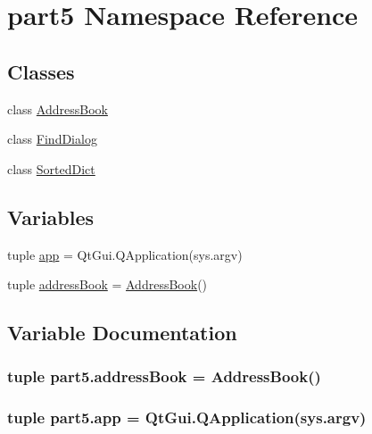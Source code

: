 \hypertarget{namespacepart5}{}\section{part5 Namespace Reference}
\label{namespacepart5}
\subsection*{Classes}
\begin{DoxyCompactItemize}
\item 
class \hyperlink{classpart5_1_1AddressBook}{Address\+Book}
\item 
class \hyperlink{classpart5_1_1FindDialog}{Find\+Dialog}
\item 
class \hyperlink{classpart5_1_1SortedDict}{Sorted\+Dict}
\end{DoxyCompactItemize}
\subsection*{Variables}
\begin{DoxyCompactItemize}
\item 
tuple \hyperlink{namespacepart5_a8b3c2a776ecfcadecd6885e1886ec289}{app} = Qt\+Gui.\+Q\+Application(sys.\+argv)
\item 
tuple \hyperlink{namespacepart5_a02db1b72075a5f4a0035c599b3769d29}{address\+Book} = \hyperlink{classpart5_1_1AddressBook}{Address\+Book}()
\end{DoxyCompactItemize}


\subsection{Variable Documentation}
\hypertarget{namespacepart5_a02db1b72075a5f4a0035c599b3769d29}{}
\subsubsection[{address\+Book}]{\setlength{\rightskip}{0pt plus 5cm}tuple part5.\+address\+Book = {\bf Address\+Book}()}\label{namespacepart5_a02db1b72075a5f4a0035c599b3769d29}
\hypertarget{namespacepart5_a8b3c2a776ecfcadecd6885e1886ec289}{}
\subsubsection[{app}]{\setlength{\rightskip}{0pt plus 5cm}tuple part5.\+app = Qt\+Gui.\+Q\+Application(sys.\+argv)}\label{namespacepart5_a8b3c2a776ecfcadecd6885e1886ec289}
